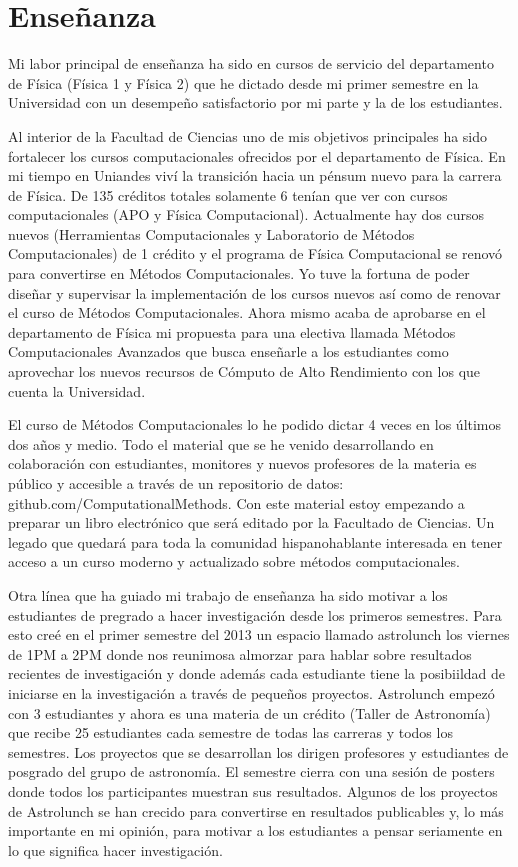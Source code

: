 \documentclass{report}
\begin{document}
\section{Enseñanza}


Mi labor principal de enseñanza ha sido en cursos de servicio del
departamento de Física (Física 1 y Física 2) que he dictado desde mi
primer semestre en la Universidad con un desempeño satisfactorio por
mi parte y la de los estudiantes.

Al interior de la Facultad de Ciencias uno de mis objetivos
principales ha sido fortalecer los cursos computacionales ofrecidos por
el departamento de Física. En mi tiempo en Uniandes viví la transición
hacia un pénsum nuevo para la carrera de Física. De 135 créditos
totales solamente 6 tenían que ver con cursos computacionales (APO y
Física Computacional). Actualmente hay dos cursos nuevos (Herramientas
Computacionales y Laboratorio de Métodos Computacionales) de 1 crédito
y el programa de Física Computacional se renovó para convertirse en
Métodos Computacionales. Yo tuve la fortuna de poder diseñar y
supervisar la implementación de los cursos nuevos así como de renovar
el curso de Métodos  Computacionales. Ahora mismo acaba de aprobarse
en el departamento de Física mi propuesta para una electiva llamada
Métodos Computacionales Avanzados que busca enseñarle a los
estudiantes como aprovechar los nuevos  recursos de Cómputo de Alto
Rendimiento con los que cuenta la Universidad.


El curso de Métodos Computacionales lo he podido dictar 4 veces en los
últimos dos años y medio. Todo el material que se he venido
desarrollando en colaboración con estudiantes, monitores y nuevos
profesores de la materia es público y accesible a través de un
repositorio de datos: github.com/ComputationalMethods.
Con este material estoy empezando a preparar un libro electrónico que
será editado por la Facultado de Ciencias. Un legado que quedará para
toda la comunidad hispanohablante interesada en tener acceso a un
curso moderno y actualizado sobre métodos computacionales.


Otra línea que ha guiado mi trabajo de enseñanza ha sido motivar a los estudiantes
de pregrado a hacer investigación desde los primeros semestres. Para
esto creé en el primer semestre del 2013 un espacio llamado astrolunch
los viernes de 1PM a 2PM donde nos reunimosa almorzar para hablar
sobre resultados recientes de investigación y donde además cada
estudiante tiene la posibiildad de iniciarse en la investigación a
través de pequeños proyectos. Astrolunch empezó con 3 estudiantes y
ahora es una materia de un crédito (Taller de Astronomía) que recibe
25 estudiantes cada semestre de todas las carreras y todos los
semestres. Los proyectos que se desarrollan los dirigen profesores y
estudiantes de posgrado del grupo de astronomía. El semestre cierra
con una sesi\'on de posters donde todos los participantes muestran sus
resultados. Algunos de los
proyectos de Astrolunch se han crecido para convertirse en resultados
publicables y, lo más importante en mi opinión, para motivar a los
estudiantes a pensar seriamente en lo que significa hacer investigación.
\end{document}
